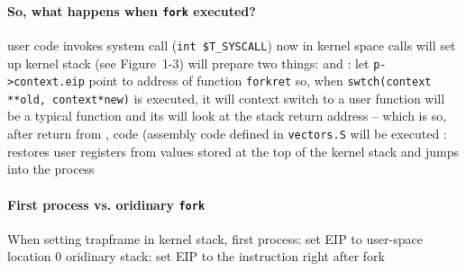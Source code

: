\documentclass{note}
\begin{document}
\paragraph{So, what happens when {\bf \texttt{fork}} executed?}
  \ben
  \w user code invokes system call  (\verb+int $T_SYSCALL+)
  \w now in kernel space
  \w {} calls 
  \w {} will set up kernel stack (see Figure~1-3)
     \bit
     \w will prepare two things:  and  
     \w {}: let \verb+p->context.eip+ point to address of function
     \verb+forkret+
     \w so, when \verb+swtch(context **old, context*new)+ is executed, it will context switch to a user
     function  
     \w {} will be a typical function and its  will look
     at the stack return address -- which is 
     \w so, after return from ,  code (assembly code
     defined in \verb+vectors.S+ will be executed
     \w {}: restores user registers from values stored at the top of
     the kernel stack and jumps into the process
     \eit
  \een

\paragraph{First process vs. oridinary {\bf \texttt{fork}}}
\bit
\w When setting trapframe in kernel stack,
  \bit
  \w first process: set EIP to user-space location 0
  \w oridinary stack: set EIP to the instruction right after fork
  \eit
\eit
\end{document}

